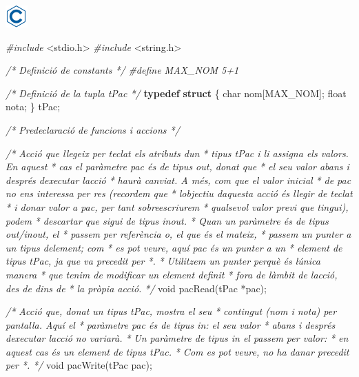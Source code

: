 \documentclass[
]{book}
\newenvironment{Shaded}{\begin{snugshade}}{\end{snugshade}}
\newcommand{\CommentTok}[1]{\textcolor[rgb]{0.56,0.35,0.01}{\textit{#1}}}
\newcommand{\DataTypeTok}[1]{\textcolor[rgb]{0.13,0.29,0.53}{#1}}
\newcommand{\ImportTok}[1]{#1}
\newcommand{\KeywordTok}[1]{\textcolor[rgb]{0.13,0.29,0.53}{\textbf{#1}}}
\newcommand{\NormalTok}[1]{#1}
\newcommand{\PreprocessorTok}[1]{\textcolor[rgb]{0.56,0.35,0.01}{\textit{#1}}}
\begin{document}
\includegraphics{./img/c.png}

\begin{Shaded}
\begin{Highlighting}[]
\PreprocessorTok{\#include }\ImportTok{\textless{}stdio.h\textgreater{}}
\PreprocessorTok{\#include }\ImportTok{\textless{}string.h\textgreater{}}

\CommentTok{/* Definició de constants */}
\PreprocessorTok{\#define MAX\_NOM 5+1}

\CommentTok{/* Definició de la tupla tPac */}
\KeywordTok{typedef} \KeywordTok{struct}\NormalTok{ \{}
    \DataTypeTok{char}\NormalTok{ nom[MAX\_NOM];}
    \DataTypeTok{float}\NormalTok{ nota;}
\NormalTok{\} tPac;}

\CommentTok{/* Predeclaració de funcions i accions */}

\CommentTok{/* Acció que llegeix per teclat els atributs d\textquotesingle{}un }
\CommentTok{ * tipus tPac i li assigna els valors. En aquest}
\CommentTok{ * cas el paràmetre pac és de tipus \textquotesingle{}out\textquotesingle{}, donat que }
\CommentTok{ * el seu valor abans i després d\textquotesingle{}executar l\textquotesingle{}acció}
\CommentTok{ * haurà canviat. A més, com que el valor inicial}
\CommentTok{ * de pac no ens interessa per res (recordem que}
\CommentTok{ * l\textquotesingle{}objectiu d\textquotesingle{}aquesta acció és llegir de teclat}
\CommentTok{ * i donar valor a pac, per tant sobreescriurem }
\CommentTok{ * qualsevol valor previ que tingui), podem }
\CommentTok{ * descartar que sigui de tipus \textquotesingle{}inout\textquotesingle{}.}
\CommentTok{ * Quan un paràmetre és de tipus out/inout, el }
\CommentTok{ * passem per referència o, el que és el mateix,}
\CommentTok{ * passem un punter a un tipus d\textquotesingle{}element; com }
\CommentTok{ * es pot veure, aquí pac és un punter a un }
\CommentTok{ * element de tipus tPac, ja que va precedit per *.}
\CommentTok{ * Utilitzem un punter perquè és l\textquotesingle{}única manera}
\CommentTok{ * que tenim de modificar un element definit}
\CommentTok{ * fora de l\textquotesingle{}àmbit de l\textquotesingle{}acció, des de dins de }
\CommentTok{ * la pròpia acció.}
\CommentTok{ */}
\DataTypeTok{void}\NormalTok{ pacRead(tPac *pac);}

\CommentTok{/* Acció que, donat un tipus tPac, mostra el seu }
\CommentTok{ * contingut (nom i nota) per pantalla. Aquí el }
\CommentTok{ * paràmetre pac és de tipus \textquotesingle{}in\textquotesingle{}: el seu valor}
\CommentTok{ * abans i després d\textquotesingle{}executar l\textquotesingle{}acció no variarà.}
\CommentTok{ * Un paràmetre de tipus \textquotesingle{}in\textquotesingle{} el passem per valor: }
\CommentTok{ * en aquest cas és un element de tipus tPac. }
\CommentTok{ * Com es pot veure, no ha d\textquotesingle{}anar precedit per *.}
\CommentTok{ */}
\DataTypeTok{void}\NormalTok{ pacWrite(tPac pac);}


\end{Highlighting}
\end{Shaded}
\end{document}
